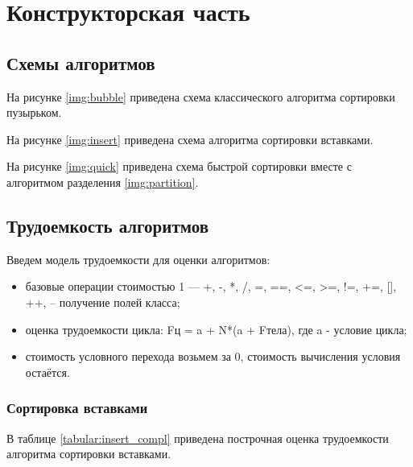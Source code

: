 \chapter{Конструкторская часть}

\section{Схемы алгоритмов}

На рисунке \ref{img:bubble} приведена схема классического алгоритма сортировки пузырьком.

На рисунке \ref{img:insert} приведена схема алгоритма сортировки вставками.

На рисунке \ref{img:quick} приведена схема быстрой сортировки вместе с алгоритмом разделения \ref{img:partition}.

\newpage
{}

\newpage
{}

\newpage
{}

\newpage
{}


\section{Трудоемкость алгоритмов}
Введем модель трудоемкости для оценки алгоритмов:
\begin{itemize}
	\item  базовые операции стоимостью 1 — +, -, *, /, =, ==, <=, >=, !=, +=, [], ++, -- получение полей класса;
	\item оценка трудоемкости цикла: Fц = a + N*(a + Fтела), где a - условие цикла;
	\item стоимость условного перехода возьмем за 0, стоимость вычисления условия остаётся.
\end{itemize}


\subsection{Сортировка вставками}

В таблице \ref{tabular:insert_compl} приведена построчная оценка трудоемкости алгоритма сортировки вставками.

